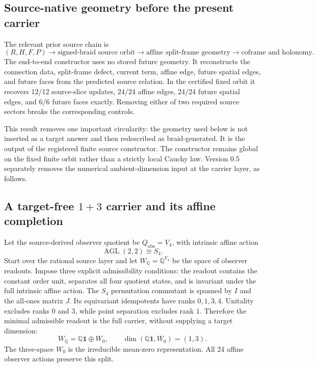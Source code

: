 \documentclass[11pt]{article}
\theoremstyle{definition}
\theoremstyle{remark}
\newcommand{\id}{\mathbf{1}}
\begin{document}
\subsection{Source-native geometry before the present carrier}

The relevant prior source chain is
\begin{equation}\label{eq:sourcechain}
 (R,H,F,P)
 \longrightarrow \text{signed-braid source orbit}
 \longrightarrow \text{affine split-frame geometry}
 \longrightarrow \text{coframe and holonomy}.
\end{equation}
The end-to-end constructor uses no stored future geometry. It reconstructs the connection data, split-frame defect, current term, affine edge, future spatial edges, and future faces from the predicted source relation. In the certified fixed orbit it recovers 12/12 source-slice updates, 24/24 affine edges, 24/24 future spatial edges, and 6/6 future faces exactly. Removing either of two required source sectors breaks the corresponding controls.

This result removes one important circularity: the geometry used below is not inserted as a target answer and then redescribed as braid-generated. It is the output of the registered finite source constructor. The constructor remains global on the fixed finite orbit rather than a strictly local Cauchy law. Version 0.5 separately removes the numerical ambient-dimension input at the carrier layer, as follows.

\subsection{A target-free $1+3$ carrier and its affine completion}

Let the source-derived observer quotient be $Q_{\mathrm{obs}}=V_4$, with intrinsic affine action
\[
 \operatorname{AGL}(2,2)\cong S_4.
\]
Start over the rational source layer and let $W_{\mathbb Q}=\mathbb Q^{V_4}$ be the space of observer readouts. Impose three explicit admissibility conditions: the readout contains the constant order unit, separates all four quotient states, and is invariant under the full intrinsic affine action. The $S_4$ permutation commutant is spanned by $I$ and the all-ones matrix $J$. Its equivariant idempotents have ranks $0,1,3,4$. Unitality excludes ranks $0$ and $3$, while point separation excludes rank $1$. Therefore the minimal admissible readout is the full carrier, without supplying a target dimension:
\begin{equation}\label{eq:source13}
 W_{\mathbb Q}=\mathbb Q\id\oplus W_0,
 \qquad \dim(\mathbb Q\id,W_0)=(1,3).
\end{equation}
The three-space $W_0$ is the irreducible mean-zero representation. All 24 affine observer actions preserve this split.
\end{document}
